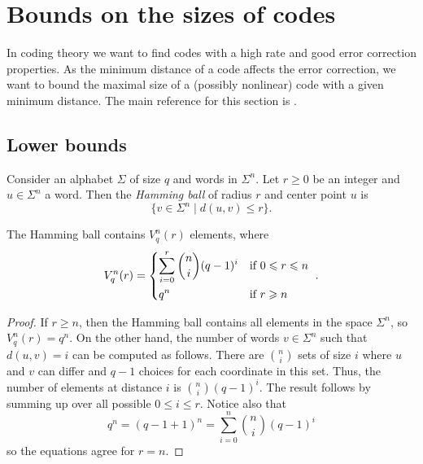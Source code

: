 \documentclass[../main.tex]{subfiles}
\begin{document}
\section{Bounds on the sizes of codes}

In coding theory we want to find codes with a high rate and good error correction properties. As the minimum distance of a code affects the error correction, we want to bound the maximal size of a (possibly nonlinear) code with a given minimum distance. The main reference for this section is \cite[Chapter 5]{ling2004coding}.

\subsection{Lower bounds}

Consider an alphabet $\Sigma$ of size $q$ and words in $\Sigma^n$. Let $r \geq 0$ be an integer and $u \in \Sigma^n$ a word. Then the \emph{Hamming ball} of radius $r$ and center point $u$ is
\begin{equation*}
    \{ v \in \Sigma^n \mid d(u, v) \leq r \}.
\end{equation*}

\begin{lemma}\label{lem:Hamming_ball_size}
The Hamming ball contains $V_q^n(r)$ elements, where
\begin{equation*}
    V_q^n(r) = \begin{dcases*}
        \sum_{i=0}^r \binom{n}{i} (q - 1)^i & if $0 \leq r \leq n$ \\
        q^n & if $r \geq n$
    \end{dcases*}.
\end{equation*}
\end{lemma}

\begin{proof}
If $r \geq n$, then the Hamming ball contains all elements in the space $\Sigma^n$, so $V_q^n(r) = q^n$. On the other hand, the number of words $v \in \Sigma^n$ such that $d(u, v) = i$ can be computed as follows. There are $\binom{n}{i}$ sets of size $i$ where $u$ and $v$ can differ and $q - 1$ choices for each coordinate in this set. Thus, the number of elements at distance $i$ is $\binom{n}{i}(q-1)^i$. The result follows by summing up over all possible $0 \leq i \leq r$. Notice also that
\begin{equation*}
    q^n = (q - 1 + 1)^n = \sum_{i=0}^n \binom{n}{i}(q - 1)^i
\end{equation*}
so the equations agree for $r = n$.
\end{proof}
\end{document}
